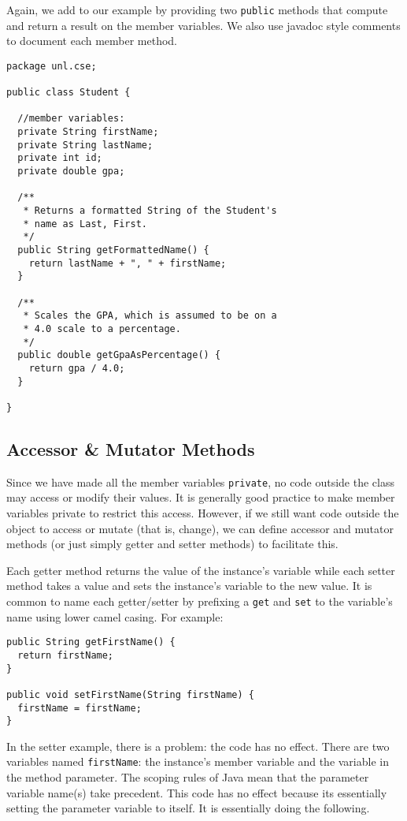 Again, we add to our example by providing two \texttt{public}
methods that compute and return a result on the member variables.  
We also use javadoc style comments to document each member method.

\begin{verbatim}
package unl.cse;

public class Student {

  //member variables:
  private String firstName;
  private String lastName;
  private int id;
  private double gpa;
  
  /**
   * Returns a formatted String of the Student's
   * name as Last, First.
   */
  public String getFormattedName() {
    return lastName + ", " + firstName;
  }
  
  /**
   * Scales the GPA, which is assumed to be on a
   * 4.0 scale to a percentage.
   */
  public double getGpaAsPercentage() {
    return gpa / 4.0;
  }
  
}
\end{verbatim}

\subsection{Accessor \& Mutator Methods}

Since we have made all the member variables \texttt{private},
no code outside the class may access or modify their values.  It is
generally good practice to make member variables private to restrict
this access.  However, if we still want code outside the object to
access or mutate (that is, change), we can define accessor and mutator
methods (or just simply getter and setter methods) to facilitate this.

Each getter method returns the value of the instance's variable while
each setter method takes a value and sets the instance's variable to
the new value.  It is common to name each getter/setter by prefixing
a \texttt{get} and \texttt{set} to the variable's
name using lower camel casing.  For example:

\begin{verbatim}
public String getFirstName() {
  return firstName;
}

public void setFirstName(String firstName) {
  firstName = firstName;
} 
\end{verbatim}

In the setter example, there is a problem: the code has no effect.
There are two variables named \texttt{firstName}: the
instance's member variable and the variable in the method parameter.
The scoping rules of Java mean that the parameter variable name(s)
take precedent.  This code has no effect because its essentially setting
the parameter variable to itself.  It is essentially doing the following.

